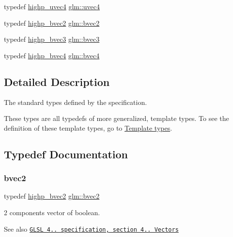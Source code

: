 \begin{DoxyCompactItemize}
\item 
typedef \hyperlink{group__core__precision_gae48d6e9a99afc33e6fa51e5d576dfd1a}{highp\+\_\+uvec4} \hyperlink{group__core__types_ga1c426d19627b32b14f0089f7f4ba7b1d}{glm\+::uvec4}
\item 
typedef \hyperlink{group__core__precision_gad8f63e4c7546320f6b72808fadfda3c2}{highp\+\_\+bvec2} \hyperlink{group__core__types_ga7523cf292181cf7daef3aa0a3267d8e3}{glm\+::bvec2}
\item 
typedef \hyperlink{group__core__precision_ga0e3365e13160aa93d2a9c68529a013ce}{highp\+\_\+bvec3} \hyperlink{group__core__types_ga3f07d6d37fc6fe875170fd5799685bcf}{glm\+::bvec3}
\item 
typedef \hyperlink{group__core__precision_gaa99e0301060bf06e7750c1c3591b6b4e}{highp\+\_\+bvec4} \hyperlink{group__core__types_ga6bb211b3d3bebae3867548d5673ca5cd}{glm\+::bvec4}
\end{DoxyCompactItemize}


\subsection{Detailed Description}
The standard types defined by the specification. 

These types are all typedefs of more generalized, template types. To see the definition of these template types, go to \hyperlink{group__core__template}{Template types}. 

\subsection{Typedef Documentation}
\mbox{\label{group__core__types_ga7523cf292181cf7daef3aa0a3267d8e3}} 
\subsubsection{\texorpdfstring{bvec2}{bvec2}}
{\footnotesize\ttfamily typedef \hyperlink{group__core__precision_gad8f63e4c7546320f6b72808fadfda3c2}{highp\+\_\+bvec2} \hyperlink{group__core__types_ga7523cf292181cf7daef3aa0a3267d8e3}{glm\+::bvec2}}

2 components vector of boolean.

\begin{DoxySeeAlso}{See also}
\href{http://www.opengl.org/registry/doc/GLSLangSpec.4.20.8.pdf}{\tt G\+L\+SL 4.. specification, section 4.. Vectors} 
\end{DoxySeeAlso}
\mbox{\label{group__core__types_ga3f07d6d37fc6fe875170fd5799685bcf}} 

